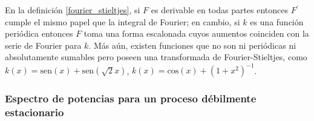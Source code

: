 \documentclass[12pt,a4paper]{mitthesis}
\newtheorem{thrm}{Teorema}
\newcommand{\R}{\mathbb{R}}
\newcommand{\prima}{^{\prime}}
\newcommand{\COS}[1]{\mathrm{cos}\left( #1 \right)}
\newcommand{\SEN}[1]{\mathrm{sen}\left( #1 \right)}
\begin{document}
En la definici\'on \ref{fourier_stieltjes}, si $F$ es derivable en todas partes entonces $F\prima$ 
cumple el mismo papel que la integral de Fourier; en cambio, si $k$ es una funci\'on peri\'odica 
entonces $F$ toma una forma escalonada cuyos aumentos coinciden con la serie de Fourier para $k$. 
M\'as a\'un, existen funciones que no son ni peri\'odicas ni absolutamente sumables pero poseen 
una transformada de Fourier-Stieltjes, como $k(x)=\SEN{x}+\SEN{\sqrt{2}x}$, 
$k(x)=\COS{x} + (1+x^{2})^{-1}$.

\subsubsection{Espectro de potencias para un proceso d\'ebilmente estacionario}
\end{document}
